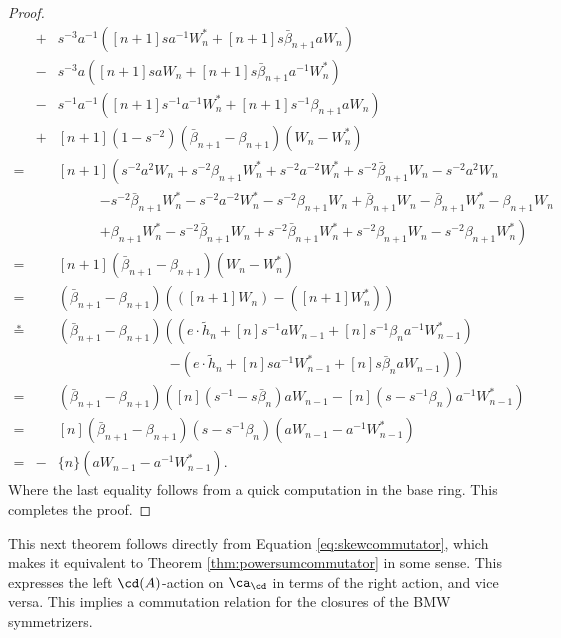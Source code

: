 \begin{proof}
\begin{eqnarray*}
&+& s^{-3}a^{-1}\left( [n+1]sa^{-1}W^*_n + [n+1]s\bar{\beta}_{n+1}aW_n \right) \\
&-&s^{-3}a\left( [n+1]saW_n + [n+1]s\bar{\beta}_{n+1}a^{-1}W^*_n \right) \\
&-& s^{-1}a^{-1}\left( [n+1]s^{-1}a^{-1}W^*_n + [n+1]s^{-1}\beta_{n+1}aW_n \right) \\
&+& [n+1]\left(1-s^{-2} \right) \left( \bar{\beta}_{n+1} - \beta_{n+1} \right) \left( W_n - W^*_n \right)\\
=&& [n+1]\left( s^{-2}a^2W_n + s^{-2}\beta_{n+1}W^*_n + s^{-2}a^{-2}W^*_n + s^{-2}\bar{\beta}_{n+1}W_n - s^{-2}a^{2}W_n \right. \\
&&\qquad\quad \left. - s^{-2}\bar{\beta}_{n+1}W^*_n - s^{-2}a^{-2}W^*_n - s^{-2}\beta_{n+1}W_n + \bar{\beta}_{n+1}W_n - \bar{\beta}_{n+1}W^*_n - \beta_{n+1}W_n \right. \\
&&\qquad\quad \left. + \beta_{n+1}W^*_n - s^{-2}\bar{\beta}_{n+1}W_n + s^{-2}\bar{\beta}_{n+1}W^*_n + s^{-2}\beta_{n+1}W_n - s^{-2}\beta_{n+1}W^*_n \right) \\
=&& [n+1]\left( \bar{\beta}_{n+1} - \beta_{n+1} \right) \left( W_n - W^*_n \right) \\
=&& \left( \bar{\beta}_{n+1} - \beta_{n+1} \right) \left( \left( [n+1]W_n \right) - \left( [n+1]W^*_n \right) \right) \\
\overset{\ast}{=}&& \left( \bar{\beta}_{n+1} - \beta_{n+1} \right) \left( \left( e \cdot \tilde{h}_{n} + [n]s^{-1}aW_{n-1} + [n]s^{-1}\beta_{n}a^{-1}W^*_{n-1} \right) \right. \\
&& \qquad\qquad\qquad\qquad \left. -\left( e \cdot \tilde{h}_{n} + [n]sa^{-1}W^*_{n-1} + [n]s\bar{\beta}_{n}aW_{n-1} \right) \right) \\
=&& \left( \bar{\beta}_{n+1} - \beta_{n+1} \right) \left( [n]\left( s^{-1} - s\bar{\beta}_{n} \right) aW_{n-1} - [n]\left( s-s^{-1}\beta_{n} \right) a^{-1}W^*_{n-1} \right) \\
=&& [n]\left(\bar{\beta}_{n+1} - \beta_{n+1} \right) \left( s - s^{-1}\beta_{n} \right) \left( aW_{n-1} - a^{-1}W^*_{n-1} \right) \\
=&-& \{n\}\left( aW_{n-1} - a^{-1}W^*_{n-1} \right).
\end{eqnarray*}
Where the last equality follows from a quick computation in the base ring. This completes the proof.
\end{proof}

This next theorem follows directly from Equation \eqref{eq:skewcommutator}, which makes it equivalent to Theorem \ref{thm:powersumcommutator} in some sense. This expresses the left $\cd(A)$-action on $\ca_\cd$ in terms of the right action, and vice versa. This implies a commutation relation for the closures of the BMW symmetrizers. 

